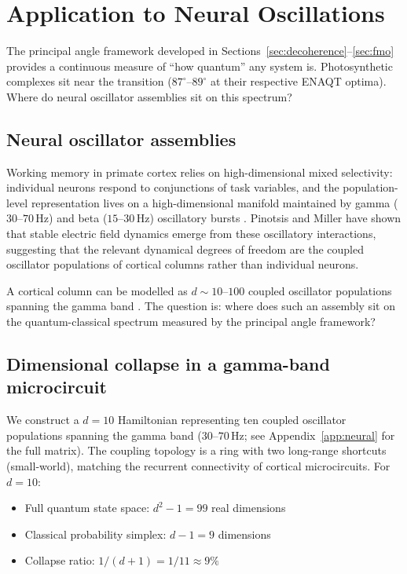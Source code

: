 \documentclass[12pt,a4paper]{article}
\theoremstyle{definition}
\theoremstyle{remark}
\begin{document}
\section{Application to Neural Oscillations}
\label{sec:neural}

The principal angle framework developed in Sections~\ref{sec:decoherence}--\ref{sec:fmo} provides a continuous measure of ``how quantum'' any system is. Photosynthetic complexes sit near the transition ($87^\circ$--$89^\circ$ at their respective ENAQT optima). Where do neural oscillator assemblies sit on this spectrum?

\subsection{Neural oscillator assemblies}
\label{sec:neural-assemblies}

Working memory in primate cortex relies on high-dimensional mixed selectivity: individual neurons respond to conjunctions of task variables, and the population-level representation lives on a high-dimensional manifold maintained by gamma ($30$--$70$\,Hz) and beta ($15$--$30$\,Hz) oscillatory bursts \cite{lundqvist2016gamma,rigotti2013importance,fusi2016neurons,miller2018working}. Pinotsis and Miller \cite{pinotsis2023cytoelectric} have shown that stable electric field dynamics emerge from these oscillatory interactions, suggesting that the relevant dynamical degrees of freedom are the coupled oscillator populations of cortical columns rather than individual neurons.

A cortical column can be modelled as $d \sim 10$--$100$ coupled oscillator populations spanning the gamma band \cite{buzsaki2012mechanisms}. The question is: where does such an assembly sit on the quantum-classical spectrum measured by the principal angle framework?

\subsection{Dimensional collapse in a gamma-band microcircuit}
\label{sec:neural-collapse}

We construct a $d = 10$ Hamiltonian representing ten coupled oscillator populations spanning the gamma band ($30$--$70$\,Hz; see Appendix~\ref{app:neural} for the full matrix). The coupling topology is a ring with two long-range shortcuts (small-world), matching the recurrent connectivity of cortical microcircuits. For $d = 10$:
\begin{itemize}
\item Full quantum state space: $d^2 - 1 = 99$ real dimensions
\item Classical probability simplex: $d - 1 = 9$ dimensions
\item Collapse ratio: $1/(d+1) = 1/11 \approx 9\%$
\end{itemize}
\end{document}
